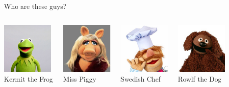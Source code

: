 \documentclass{beamer}\usepackage[]{graphicx}\usepackage[]{color}
\begin{document}
\begin{darkframes}
\begin{frame}{Who are these guys?}
  \begin{columns}[onlytextwidth]
      \begin{center}
        \includegraphics[width=1in]{kermitthefrog} \\
        Kermit the Frog
      \end{center}
      \begin{center}
        \includegraphics[width=1in]{misspiggy} \\
        Miss Piggy
      \end{center}
      \begin{center}
        \includegraphics[width=1in]{swedishchef} \\
        Swedish Chef
      \end{center}
      \begin{center}
        \includegraphics[width=1in]{rowlf} \\
        Rowlf the Dog
      \end{center}
  \end{columns}
  \smallskip
  \begin{columns}[onlytextwidth]
      \begin{center}

\end{center}
\end{columns}
\end{frame}
\end{darkframes}
\end{document}
